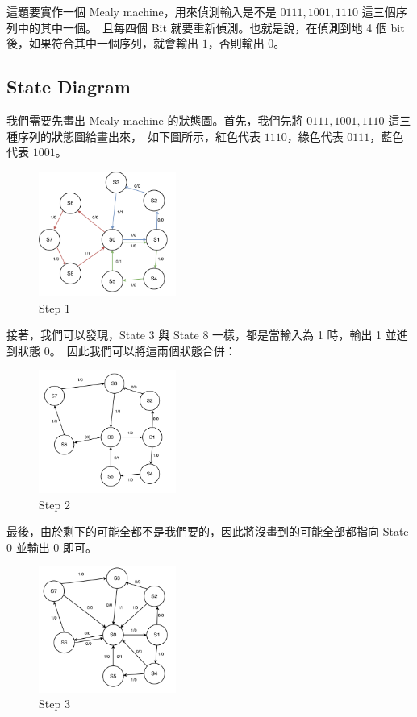 \documentclass[10.5pt,compsoc,UTF8]{CjC}
\theoremstyle{mystyle}
\begin{document}
這題要實作一個 Mealy machine，用來偵測輸入是不是 $0111, 1001, 1110$ 這三個序列中的其中一個。\
且每四個 Bit 就要重新偵測。也就是說，在偵測到地 4 個 bit 後，如果符合其中一個序列，就會輸出 $1$，否則輸出 $0$。

\subsection{State Diagram}

我們需要先畫出 Mealy machine 的狀態圖。首先，我們先將 $0111, 1001, 1110$ 這三種序列的狀態圖給畫出來，\
如下圖所示，紅色代表 $1110$，綠色代表 $0111$，藍色代表 $1001$。

\begin{figure}[h!]
  \centering
  \includegraphics[width=0.4\textwidth]{./img/Q4-SD1.png}
  \caption{Step 1}
  \label{fig:SD1}
\end{figure}

接著，我們可以發現，State 3 與 State 8 一樣，都是當輸入為 1 時，輸出 1 並進到狀態 0。\
因此我們可以將這兩個狀態合併：

\begin{figure}[h!]
  \centering
  \includegraphics[width=0.4\textwidth]{./img/Q4-SD2.png}
  \caption{Step 2}
  \label{fig:SD2}
\end{figure}

\newpage
最後，由於剩下的可能全都不是我們要的，因此將沒畫到的可能全部都指向 State 0 並輸出 0 即可。

\begin{figure}[h!]
  \centering
  \includegraphics[width=0.4\textwidth]{./img/Q4-SD3.png}
  \caption{Step 3}
  \label{fig:SD3}
\end{figure}
\end{document}
